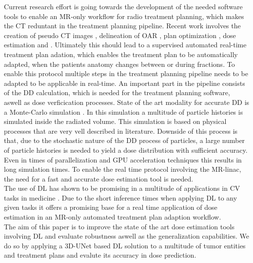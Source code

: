 Current research effort is going towards the development of the needed software tools to enable an MR-only workflow for radio treatment planning, which makes the \acs{CT} reduntant in the treatment planning pipeline. 
Recent work involves the creation of pseudo CT images \cite{han_mr-based_2017, wolterink_deep_2017, dinkla_mr-only_2018}, delineation of \acs{OAR} \cite{kazemifar_segmentation_2018, liang_deep-learning-based_2019, shen_medical_2019}, plan optimization \cite{fan_automatic_2019, liu_deep_2019}, dose estimation \cite{javaid_mitigating_2019} and .
Ultimately this should lead to a supervised automated real-time treatment plan adation, which enables the treatment plan to be automatically adapted, when the patients anatomy changes between or during fractions.
To enable this protocol multiple steps in the treatment planning pipeline needs to be adapted to be applicable in real-time.
An important part in the pipeline consists of the \ac{DD} calculation, which is needed for the treatment planning software, aswell as dose verficication processes.
State of the art modality for accurate \acs{DD} is a Monte-Carlo simulation \cite{jabbari_review_2011}. 
In this simulation a multitude of particle histories is simulated inside the radiated volume.
This simulation is based on physical processes that are very vell described in literature.
Downside of this process is that, due to the stochastic nature of the \acs{DD} process of particles, a large number of particle histories is needed to yield a dose distribution with sufficient accuracy.
Even in times of parallelization and GPU acceleration techniques this results in long simulation times.
To enable the real time protocol involving the MR-linac, the need for a fast and accurate dose estimation tool is needed.\\
The use of \ac{DL} has shown to be promising in a multitude of applications in \ac{CV} tasks in medicine \cite{esteva_dermatologist-level_2017,cheng_computer-aided_2016,cicero_training_2017,iizuka_deep_2020,poplin_prediction_2018}.
Due to the short inference times when applying \acs{DL} to any given tasks it offers a promising base for a real time application of dose estimation in an MR-only automated treatment plan adaption workflow.\\
The aim of this paper is to improve the state of the art dose estimation tools involving \acs{DL} and evaluate robustness aswell as the generalization capabilities.
We do so by applying a 3D-UNet based \acs{DL} solution to a multitude of tumor entities and treatment plans and evalute its accuracy in dose prediction.